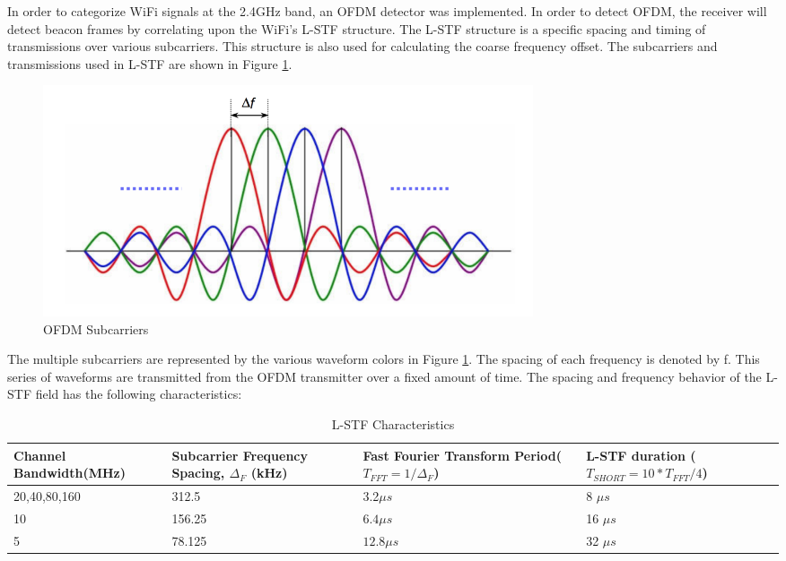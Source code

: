 In order to categorize WiFi signals at the 2.4GHz band, an OFDM detector was implemented. In order to detect OFDM, the receiver will detect beacon frames by correlating upon the WiFi’s L-STF structure. The L-STF structure is a specific spacing and timing of transmissions over various subcarriers. This structure is also used for calculating the coarse frequency offset. The subcarriers and transmissions used in L-STF are shown in Figure \ref{fig:ofdm_subcarriers}. \par 
\begin{figure}[ht!]
	\centering
	\includegraphics[width=0.70\textwidth]{img/ofdm-subcarriers}
	\caption{OFDM Subcarriers}
	\label{fig:ofdm_subcarriers}
\end{figure}\par
The multiple subcarriers are represented by the various waveform colors in Figure \ref{fig:ofdm_subcarriers}. The spacing of each frequency is denoted by f. This series of waveforms are transmitted from the OFDM transmitter over a fixed amount of time. The spacing and frequency behavior of the L-STF field has the following characteristics: \par
\begin{table}[ht!]
	\centering
\begin{tabular}{|p{3.6cm}|p{4cm}|p{4cm}|p{4.5cm}|}
	\hline
	Channel Bandwidth\newline(MHz) & Subcarrier Frequency Spacing, $\Delta_F$ (kHz) &Fast Fourier Transform Period\newline($T_{FFT}=1/\Delta_F$)& L-STF duration \newline($T_{SHORT}=10*T_{FFT}/4$) \\
	\hline
	20,40,80,160 & 312.5 &3.2$\mu s$ &8 $\mu s$ \\
	10 & 156.25 &$6.4\mu s$ &16 $\mu s $\\
	5 & 78.125 &$12.8\mu s$ &32 $\mu s$  \\
	\hline
\end{tabular} 
	\caption{L-STF Characteristics}
	\label{table:spacing}
\end{table} \par 
	
